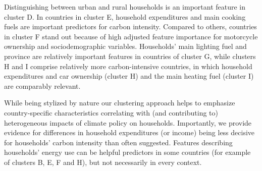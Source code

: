 \documentclass[12pt, a4paper]{article}
\begin{document}
Distinguishing between urban and rural households is an important feature in cluster D. In countries in cluster E, household expenditures and main cooking fuels are important predictors for carbon intensity. Compared to others, countries in cluster F stand out because of high adjusted feature importance for motorcycle ownership and sociodemographic variables. Households' main lighting fuel and province are relatively important features in countries of cluster G, while clusters H and I comprise relatively more carbon-intensive countries, in which household expenditures and car ownership (cluster H) and the main heating fuel (cluster I) are comparably relevant.

While being stylized by nature our clustering approach helps to emphasize country-specific characteristics correlating with (and contributing to) heterogeneous impacts of climate policy on households. Importantly, we provide evidence for differences in household expenditures (or income) being less decisive for households' carbon intensity than often suggested. Features describing households' energy use can be helpful predictors in some countries (for example of clusters B, E, F and H), but not necessarily in every context.     
\end{document}
